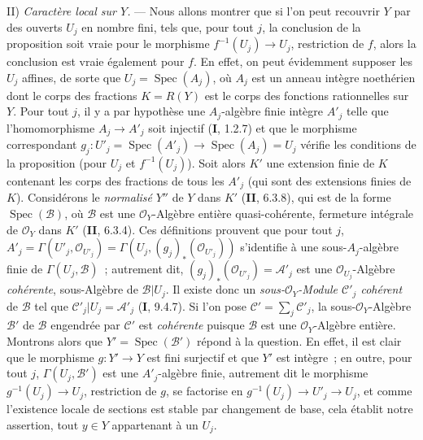 II) \emph{Caractère local sur $Y$.} --- Nous allons montrer que si l'on peut
recouvrir $Y$ par des ouverts $U_j$ en nombre fini, tels que, pour tout $j$, la
conclusion de la proposition soit vraie pour le morphisme $f^{-1}(U_j)\to U_j$,
restriction de $f$, alors la conclusion est vraie également pour $f$. En effet, on
peut évidemment supposer les $U_j$ affines, de sorte que $U_j=\operatorname{Spec}(A_j)$, où
$A_j$ est un anneau intègre noethérien dont le corps des fractions $K=R(Y)$ est le
corps des fonctions rationnelles sur $Y$. Pour tout $j$, il y a par hypothèse une
$A_j$-algèbre finie intègre $A'_j$ telle que l'homomorphisme $A_j\to A'_j$ soit
injectif (\textbf{I}, 1.2.7) et que le morphisme correspondant
$g_j:U'_j=\operatorname{Spec}(A'_j)\to\operatorname{Spec}(A_j)=U_j$ vérifie les conditions de la proposition
(pour $U_j$ et $f^{-1}(U_j)$). Soit alors $K'$ une extension finie de $K$ contenant
les corps des fractions de tous les $A'_j$ (qui sont des extensions finies de $K$).
Considérons le \emph{normalisé} $Y''$ de $Y$ dans $K'$ (\textbf{II}, 6.3.8), qui est de la
forme $\operatorname{Spec}(\mathcal B)$, où $\mathcal B$ est une $\mathcal O_Y$-Algèbre entière
quasi-cohérente, fermeture intégrale de $\mathcal O_Y$ dans $K'$ (\textbf{II},
6.3.4). Ces définitions prouvent que pour tout $j$,
$A'_j=\Gamma(U'_j,\mathcal O_{U'_j})
=\Gamma(U_j,(g_j)_*(\mathcal O_{U'_j}))$
s'identifie à une sous-$A_j$-algèbre finie de $\Gamma(U_j,\mathcal B)$~; autrement
dit, $(g_j)_*(\mathcal O_{U'_j})=\mathcal A'_j$ est une
$\mathcal O_{U_j}$-Algèbre \emph{cohérente}, sous-Algèbre de $\mathcal B|U_j$. Il existe
donc un \emph{sous-$\mathcal O_Y$-Module $\mathcal C'_j$ cohérent} de $\mathcal B$ tel que
$\mathcal C'_j|U_j=\mathcal A'_j$ (\textbf{I}, 9.4.7). Si l'on pose
$\mathcal C'=\sum_j\mathcal C'_j$, la sous-$\mathcal O_Y$-Algèbre $\mathcal B'$ de
$\mathcal B$ engendrée par $\mathcal C'$ est \emph{cohérente} puisque $\mathcal B$ est une
$\mathcal O_Y$-Algèbre entière. Montrons alors que $Y'=\operatorname{Spec}(\mathcal B')$ répond à
la question. En effet, il est clair que le morphisme $g:Y'\to Y$ est fini surjectif
et que $Y'$ est intègre~; en outre, pour tout $j$, $\Gamma(U_j,\mathcal B')$ est une
$A'_j$-algèbre finie, autrement dit le morphisme $g^{-1}(U_j)\to U_j$, restriction
de $g$, se factorise en $g^{-1}(U_j)\to U'_j\to U_j$, et comme l'existence locale
de sections est stable par changement de base, cela établit notre assertion, tout
$y\in Y$ appartenant à un $U_j$.

